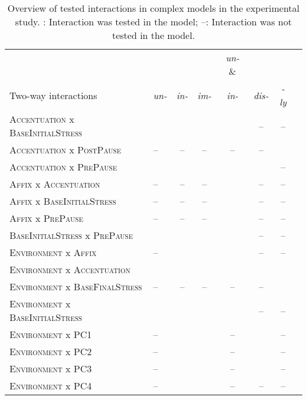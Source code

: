 \begin{table}\small
\caption{Overview of tested interactions in complex models in the experimental study. \checkmark: Interaction was tested in the model; --: Interaction was not tested in the model.\label{interactions experiments complex models}}
\begin{tabular}{llcccccc}\lsptoprule
	 & &&& \textit{un-} \& &  &\\
	{Two-way interactions} & \textit{un-} & \textit{in-} & \textit{im-} &   \textit{in-} & \textit{dis-} & \textit{-ly}\\
	\midrule
	\textsc{Accentuation} x \textsc{BaseInitialStress}  &\checkmark &\checkmark&\checkmark&\checkmark&--&--\\		
	\textsc{Accentuation} x \textsc{PostPause}  &-- &--&--&--&--&\checkmark\\			
	\textsc{Accentuation} x \textsc{PrePause}  &\checkmark &\checkmark&\checkmark&\checkmark&\checkmark&--\\	
	\textsc{Affix} x \textsc{Accentuation}  &-- &--&--&\checkmark&--&--\\				
	\textsc{Affix} x \textsc{BaseInitialStress}  &-- &--&--&\checkmark&--&--\\				
	\textsc{Affix} x \textsc{PrePause}  &-- &--&--&\checkmark&--&--\\	
	\textsc{BaseInitialStress} x \textsc{PrePause}  &\checkmark &\checkmark&\checkmark&\checkmark&--&--\\	
	\textsc{Environment} x \textsc{Affix}  &-- &\checkmark&\checkmark&\checkmark&--&--\\
	\textsc{Environment} x \textsc{Accentuation}  &\checkmark&\checkmark&\checkmark&\checkmark&\checkmark&\checkmark\\
	\textsc{Environment} x \textsc{BaseFinalStress}  &-- &--&--&--&--&\checkmark\\		
	\textsc{Environment} x \textsc{BaseInitialStress}  &\checkmark &\checkmark&\checkmark&\checkmark&--&--\\
	\textsc{Environment} x \textsc{PC1}  &-- &\checkmark&\checkmark&--&\checkmark&--\\
	\textsc{Environment} x \textsc{PC2}  & --&\checkmark&\checkmark&--&\checkmark&--\\
	\textsc{Environment} x \textsc{PC3}  & --&\checkmark&\checkmark&--&\checkmark&--\\
	\textsc{Environment} x \textsc{PC4}  & --&\checkmark&\checkmark&--&--&--\\

\end{tabular}
\end{table}

